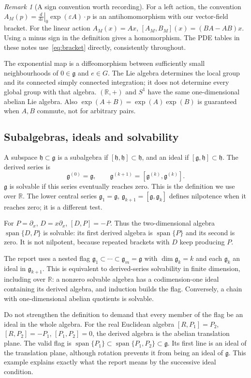 \documentclass[11pt,a4paper]{article}
\numberwithin{equation}{section}
\theoremstyle{definition}
\theoremstyle{plain}
\theoremstyle{remark}
\newtheorem{remark}[definition]{Remark}
\newcommand{\R}{\mathbb R}
\newcommand{\g}{\mathfrak g}
\newcommand{\Span}{\operatorname{span}}
\begin{document}
\begin{remark}[A sign convention worth recording]
For a left action, the convention $A_M(p)=\left.\frac d{d\varepsilon}\right|_0\exp(\varepsilon A)\cdot p$ is an antihomomorphism with our vector-field bracket. For the linear action $A_M(x)=Ax$, $[A_M,B_M](x)=(BA-AB)x$. Using a minus sign in the definition gives a homomorphism. The PDE tables in these notes use~\eqref{eq:bracket} directly, consistently throughout.
\end{remark}

The exponential map is a diffeomorphism between sufficiently small neighbourhoods of $0\in\g$ and $e\in G$. The Lie algebra determines the local group and its connected simply connected integration; it does not determine every global group with that algebra. $(\R,+)$ and $S^1$ have the same one-dimensional abelian Lie algebra. Also $\exp(A+B)=\exp(A)\exp(B)$ is guaranteed when $A,B$ commute, not for arbitrary pairs.

\subsection{Subalgebras, ideals and solvability}
A subspace $\mathfrak h\subset\g$ is a subalgebra if $[\mathfrak h,\mathfrak h]\subset\mathfrak h$, and an ideal if $[\g,\mathfrak h]\subset\mathfrak h$. The derived series is
\[
\g^{(0)}=\g,\qquad \g^{(k+1)}=[\g^{(k)},\g^{(k)}].
\]
$\g$ is solvable if this series eventually reaches zero. This is the definition we use over $\R$. The lower central series $\g_1=\g$, $\g_{k+1}=[\g,\g_k]$ defines nilpotence when it reaches zero; it is a different test.

For $P=\partial_x$, $D=x\partial_x$, $[D,P]=-P$. Thus the two-dimensional algebra $\Span\{D,P\}$ is solvable: its first derived algebra is $\Span\{P\}$ and its second is zero. It is not nilpotent, because repeated brackets with $D$ keep producing $P$.

The report uses a nested flag $\g_1\subset\cdots\subset\g_m=\g$ with $\dim\g_k=k$ and each $\g_k$ an ideal in $\g_{k+1}$. This is equivalent to derived-series solvability in finite dimension, including over $\R$: a nonzero solvable algebra has a codimension-one ideal containing its derived algebra, and induction builds the flag. Conversely, a chain with one-dimensional abelian quotients is solvable.

Do not strengthen the definition to demand that every member of the flag be an ideal in the whole algebra. For the real Euclidean algebra $[R,P_1]=P_2$, $[R,P_2]=-P_1$, $[P_1,P_2]=0$, the derived algebra is the abelian translation plane. The valid flag is $\Span\{P_1\}\subset\Span\{P_1,P_2\}\subset\g$. Its first line is an ideal of the translation plane, although rotation prevents it from being an ideal of $\g$. This example explains exactly what the report means by the successive ideal condition.
\end{document}
